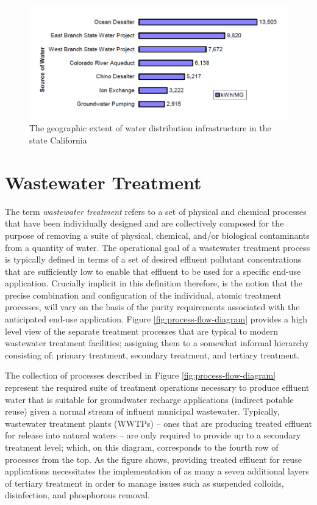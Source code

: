      \begin{figure}[!h]
       \centering
       \includegraphics[width=5.5in]{figures/energy-intensity.png}
       \caption[Energy Intensity of Water Distribution Infrastructure]{The geographic extent of water distribution infrastructure in the state California}
       \label{fig:infrastructure-energy-intensity}
     \end{figure}
     
\section{Wastewater Treatment}

The term \textit{wastewater treatment} refers to a set of physical and chemical processes that have been individually designed and are collectively composed for the purpose of removing a suite of physical, chemical, and/or biological contaminants from a quantity of water. The operational goal of a wastewater treatment process is typically defined in terms of a set of desired effluent pollutant concentrations that are sufficiently low to enable that effluent to be used for a specific end-use application. Crucially implicit in this definition therefore, is the notion that the precise combination and configuration of the individual, atomic treatment processes, will vary on the basis of the purity requirements associated with the anticipated end-use application. Figure \ref{fig:process-flow-diagram} provides a high level view of the separate treatment processes that are typical to modern wastewater treatment facilities; assigning them to a somewhat informal hierarchy consisting of: primary treatment, secondary treatment, and tertiary treatment.

The collection of processes described in Figure \ref{fig:process-flow-diagram} represent the required suite of treatment operations necessary to produce effluent water that is suitable for groundwater recharge applications (indirect potable reuse) given a normal stream of influent municipal wastewater. Typically, wastewater treatment plants (WWTPs) -- ones that are producing treated effluent for release into natural waters -- are only required to provide up to a secondary treatment level; which, on this diagram, corresponds to the fourth row of processes from the top. As the figure shows, providing treated effluent for reuse applications necessitates the implementation of as many a seven additional layers of tertiary treatment in order to manage issues such as suspended colloids, disinfection, and phosphorous removal.
     
